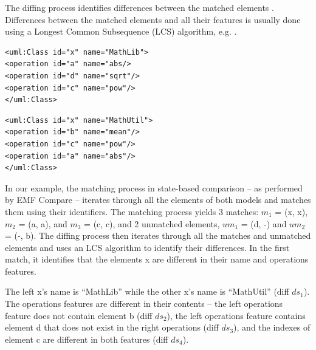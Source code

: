 The diffing process identifies differences between the matched elements \cite{DBLP:conf/sfm/BroschKLSWW12,emfcompare2018developer}.
Differences between the matched elements and all their features is usually done using a Longest Common Subsequence (LCS) algorithm, e.g. \cite{DBLP:journals/algorithmica/Meyers86}.

\vspace{-10pt}
\begin{lstlisting}[style=eol,caption={The simplified XMI of the left model in Fig. \ref{fig:left}.},label=lst:leftxmi]
<uml:Class id="x" name="MathLib">
<operation id="a" name="abs/>
<operation id="d" name="sqrt"/>
<operation id="c" name="pow"/>
</uml:Class>
\end{lstlisting}

\begin{lstlisting}[style=eol,caption={The simplified XMI of the right model in Fig. \ref{fig:right}.},label=lst:rightxmi]
<uml:Class id="x" name="MathUtil">
<operation id="b" name="mean"/>
<operation id="c" name="pow"/>
<operation id="a" name="abs"/>
</uml:Class>
\end{lstlisting}

In our example, the matching process in state-based comparison -- as performed by EMF Compare \cite{emfcompare2018developer} -- iterates through all the elements of both models and matches them using their identifiers. The matching process yields 3 matches: $m_1$ = (\textsf{x}, \textsf{x}), $m_2$ = (\textsf{a}, \textsf{a}), and $m_3$ = (\textsf{c}, \textsf{c}), and 2 unmatched elements, $um_1$ = (\textsf{d}, -) and $um_2$ = (-, \textsf{b}). The diffing process then iterates through all the matches and unmatched elements and uses an LCS algorithm to identify their differences. In the first match, it identifies that the elements \textsf{x} are different in their \textsf{name} and \textsf{operations} features. 

The left \textsf{x}'s \textsf{name} is ``MathLib'' while the other \textsf{x}'s \textsf{name} is ``MathUtil'' (diff $ds_1$). The \textsf{operations} features are different in their contents -- the left \textsf{operations} feature does not contain element \textsf{b} (diff $ds_2$), the left \textsf{operations} feature contains element \textsf{d} 
that does not exist in the right \textsf{operations} (diff $ds_3$), and the indexes of element \textsf{c} are different in both features (diff $ds_4$).

